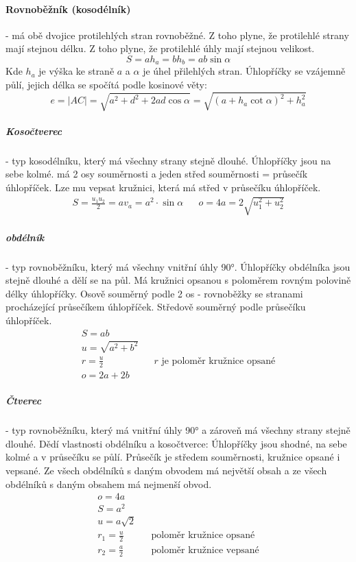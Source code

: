 \documentclass[12pt]{article}
\begin{document}
\paragraph{Rovnoběžník (kosodélník)} - má obě dvojice protilehlých stran rovnoběžné. Z toho plyne, že protilehlé strany mají stejnou délku. Z toho plyne, že protilehlé úhly mají stejnou velikost.
\begin{equation}
S = ah_a = bh_b = ab \sin\alpha
\end{equation}
Kde $h_a$ je výška ke straně $a$ a $\alpha$ je úhel přilehlých stran. Úhlopříčky se vzájemně půlí, jejich délka se spočítá podle kosinové věty:
\begin{equation}
e = |AC| = \sqrt{a^2 + d^2 +2ad\cos\alpha} = \sqrt{\left( a+h_a\cot\alpha \right)^2 + h_a^2}
\end{equation}
\subparagraph{Kosočtverec} - typ kosodélníku, který má všechny strany stejně dlouhé. Úhlopříčky jsou na sebe kolmé. má 2 osy souměrnosti a jeden střed souměrnosti = průsečík úhlopříček. Lze mu vepsat kružnici, která má střed v průsečíku úhlopříček.
\begin{align}
S = \frac{u_1 u_2}{2} = a v_a = a^2 \cdot \sin \alpha && o = 4a = 2\sqrt{u_1^2 + u_2^2}
\end{align}
\subparagraph{obdélník} - typ rovnoběžníku, který má všechny vnitřní úhly 90°. Úhlopříčky obdélníka jsou stejně dlouhé a dělí se na půl. Má kružnici opsanou s poloměrem rovným polovině délky úhlopříčky. Osově souměrný podle 2 os - rovnoběžky se stranami procházející průsečíkem úhlopříček. Středově souměrný podle průsečíku úhlopříček.
\begin{align}
S = ab\\
u = \sqrt{a^2 + b^2}\\
r = \frac{u}{2} && \text{$r$ je poloměr kružnice opsané}\\
o = 2a + 2b
\end{align}
\subparagraph{Čtverec} - typ rovnoběžníku, který má vnitřní úhly 90° a zároveň má všechny strany stejně dlouhé. Dědí vlastnosti obdélníku a kosočtverce: Úhlopříčky jsou shodné, na sebe kolmé a v průsečíku se půlí. Průsečík je středem souměrnosti, kružnice opsané i vepsané. Ze všech obdélníků s daným obvodem má největší obsah a ze všech obdélníků s daným obsahem má nejmenší obvod.
\begin{align}
o = 4a\\
S = a^2\\
u = a\sqrt{2}\\
r_1 =\frac{u}{2} && \text{poloměr kružnice opsané}\\
r_2 =\frac{a}{2} && \text{poloměr kružnice vepsané}\\
\end{align}
\end{document}

